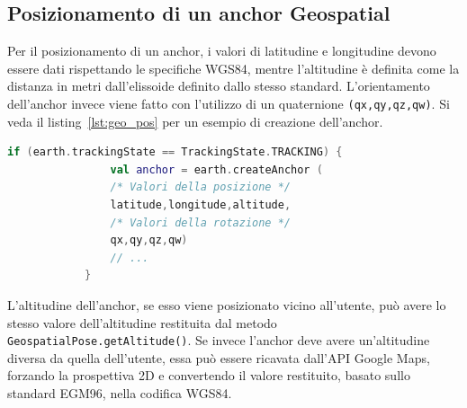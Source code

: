 \documentclass[crop=false, class=book]{standalone}
\begin{document}
	\subsection{Posizionamento di un anchor Geospatial}
	Per il posizionamento di un anchor, i valori di latitudine e longitudine devono essere dati rispettando le specifiche WGS84, mentre l'altitudine è definita come la distanza in metri dall'elissoide definito dallo stesso standard. 
	L'orientamento dell'anchor invece viene fatto con l'utilizzo di un quaternione \verb|(qx,qy,qz,qw)|. Si veda il listing~\vref{lst:geo_pos} per un esempio di creazione dell'anchor.
	\begin{center}
		\begin{minipage}{0.95\textwidth}
			\begin{lstlisting}[caption={Posizionamento di anchor Geospatial.}, label={lst:geo_pos}, language=Kotlin]
			if (earth.trackingState == TrackingState.TRACKING) {
				val anchor = earth.createAnchor (
				/* Valori della posizione */
				latitude,longitude,altitude,
				/* Valori della rotazione */
				qx,qy,qz,qw)
				// ...
			}
			\end{lstlisting}
		\end{minipage}
	\end{center}
	\noindent
	L'altitudine dell'anchor, se esso viene posizionato vicino all'utente, può avere lo stesso valore dell'altitudine restituita dal metodo \verb|GeospatialPose.getAltitude()|. Se invece l'anchor deve avere un'altitudine diversa da quella dell'utente, essa può essere ricavata dall'API Google Maps, forzando la prospettiva 2D e convertendo il valore restituito, basato sullo standard EGM96, nella codifica WGS84.
	
	
	
	
	
	
	
	
	
	
\end{document}

